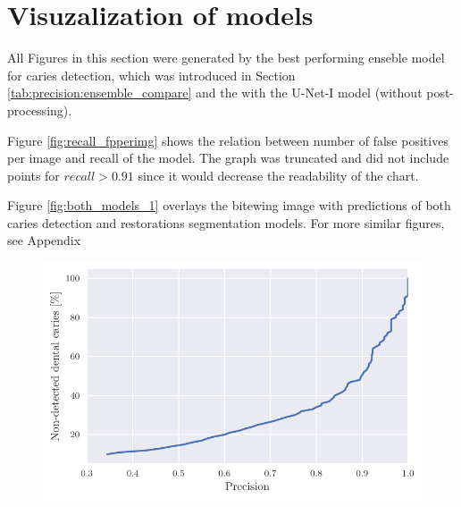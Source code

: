\section{Visuzalization of models}
\label{sec:visualization}
All Figures in this section were generated by the best performing enseble model for caries detection, which was introduced in Section \ref{tab:precision:ensemble_compare} and the with the U-Net-I model (without post-processing).

Figure \ref{fig:recall_fpperimg} shows the relation between number of false positives per image and recall of the model. The graph was truncated and did not include points for $recall > 0.91$ since it would decrease the readability of the chart.

Figure \ref{fig:both_models_1} overlays the bitewing image with predictions of both caries detection and restorations segmentation models. For more similar figures, see Appendix



\begin{figure}[h]
    \begin{floatrow}[2]
        { \includegraphics[width=\linewidth]{images/nondet_precision.pdf} }
    \end{floatrow}
\end{figure}

